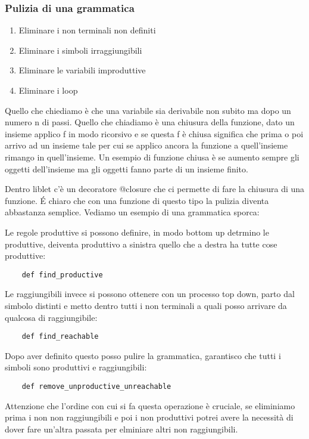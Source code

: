 \subsubsection{Pulizia di una grammatica}
\begin{enumerate}
    \item Eliminare i non terminali non definiti
    \item Eliminare i simboli irraggiungibili
    \item Eliminare le variabili improduttive
    \item Eliminare i loop
\end{enumerate}

Quello che chiediamo è che una variabile sia derivabile non subito ma dopo un numero n di passi. Quello che chiadiamo è una chiusura della funzione, dato un insieme applico f in modo ricorsivo e se questa f è chiusa significa che prima o poi arrivo ad un insieme tale per cui se applico ancora la funzione a quell'insieme rimango in quell'insieme. Un esempio di funzione chiusa è se aumento sempre gli oggetti dell'insieme ma gli oggetti fanno parte di un insieme finito.

Dentro liblet c'è un decoratore @closure che ci permette di fare la chiusura di una funzione. \'E chiaro che con una funzione di questo tipo la pulizia diventa abbastanza semplice. Vediamo un esempio di una grammatica sporca:

Le regole produttive si possono definire, in modo bottom up detrmino le produttive, deiventa produttivo a sinistra quello che a destra ha tutte cose produttive:
\begin{lstlisting}
    def find_productive
\end{lstlisting}

Le raggiungibili invece si possono ottenere con un processo top down, parto dal simbolo distinti e metto dentro tutti i non terminali a quali posso arrivare da qualcosa di raggiungibile:

\begin{lstlisting}
    def find_reachable
\end{lstlisting}

Dopo aver definito questo posso pulire la grammatica, garantisco che tutti i simboli sono produttivi e raggiungibili:
\begin{lstlisting}
    def remove_unproductive_unreachable
\end{lstlisting}

Attenzione che l'ordine con cui si fa questa operazione è cruciale, se eliminiamo prima i non non raggiungibili e poi i non produttivi potrei avere la necessità di dover fare un'altra passata per elminiare altri non raggiungibili.

